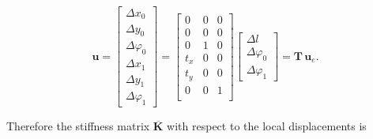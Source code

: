 \begin{equation}
\boldsymbol{u} =
\begin{bmatrix}
\Delta x_0 \\ \Delta y_0 \\ \Delta \varphi_0 \\ \Delta x_1 \\ \Delta y_1 \\ \Delta \varphi_1
\end{bmatrix}
=
\begin{bmatrix}
0 & 0 & 0 \\
0 & 0 & 0 \\
0 & 1 & 0 \\
t_x & 0 & 0 \\
t_y & 0 & 0 \\
0 & 0 & 1 \\
\end{bmatrix}
\begin{bmatrix}\Delta l \\ \Delta\varphi_0 \\ \Delta\varphi_1 \end{bmatrix}
=
\boldsymbol{T}\,\boldsymbol{u}_e.
\end{equation}

Therefore the stiffness matrix $\overline{\boldsymbol{K}}$ with respect to the local displacements is

%
%
%

